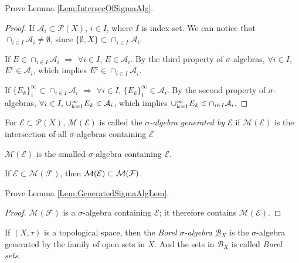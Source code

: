 \begin{exc}
    Prove Lemma \ref{Lem:IntersecOfSigmaAlg}.
\end{exc}
\begin{proof}
    If $\mathcal{A}_{i}\subset\mathcal{P}(X)$, $i\in I$, 
    where $I$ is index set. We can notice that $\cap_{i \in I}\mathcal{A}_{i}\neq\emptyset$,
    since $\{\emptyset,X\}\subset\cap_{i \in I}\mathcal{A}_{i}$.
    
    If $E\in\cap_{i\in I}\mathcal{A}_{i}$ 
    $\Rightarrow$ $\forall i\in I$, 
    $E\in\mathcal{A}_{i}$. 
    By the third property of $\sigma$-algebras, $\forall i\in I$, 
    $E^c\in\mathcal{A}_{i}$, 
    which implies $E^c\in\cap_{i \in I}\mathcal{A}_{i}$.
    
    If $\{E_{k}\}_1^{\infty}\subset\cap_{i \in I}\mathcal{A}_{i}$ 
    $\Rightarrow$ 
    $\forall i\in I$, $\{E_{k}\}_1^{\infty}\in\mathcal{A}_{i}$. 
    By the second property of $\sigma$-algebras, $\forall i\in I$, 
    $\cup_{k=1}^{\infty}E_{k}\in\mathcal{A}_{i}$, 
    which implies $\cup_{k=1}^{\infty}E_k\in\cap_{i\in I}\mathcal{A}_{i}$.
\end{proof}
\begin{defn}
\label{Defn:GeneratedSigmaAlg}
For $\mathcal{E}\subset\mathcal{P}(X)$, $\mathcal{M}(\mathcal{E})$ 
is called the \textit{$\sigma$-algebra generated by $\mathcal{E}$} 
if $\mathcal{M}(\mathcal{E})$ is the intersection of all $\sigma$-algebras 
containing $\mathcal{E}$
\end{defn}
\begin{rem}
    $\mathcal{M}(\mathcal{E})$ is the smalled $\sigma$-algebra 
    containing $\mathcal{E}$.
\end{rem}
\begin{lem}
    \label{Lem:GeneratedSigmaAlgLem}
    If $\mathcal{E}\subset\mathcal{M}(\mathcal{F})$, 
    then $\mathcal{M}(\mathcal{E})\subset\mathcal{M}(\mathcal{F})$.
\end{lem}
\begin{exc}
    Prove Lemma \ref{Lem:GeneratedSigmaAlgLem}.
\end{exc}
\begin{proof}
    $\mathcal{M}(\mathcal{F})$ is a $\sigma$-algebra containing $\mathcal{E}$; it therefore contains $\mathcal{M}(\mathcal{E})$.
\end{proof}
\begin{defn}
    If $(X,\tau)$ is a topological space, then 
    the \textit{Borel $\sigma$-algebra} $\mathcal{B}_{X}$ is the 
    $\sigma$-algebra generated by the family of open sets 
    in $X$. 
    And the sets in $\mathcal{B}_{X}$ is called \textit{Borel sets}.
\end{defn}
